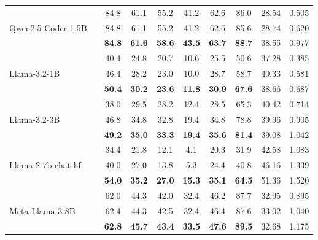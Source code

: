 \begin{table}[t]
\begin{tabular}{llcccccccc}
            \midrule
             & \standard{} & 84.8 & 61.1 & 55.2 & 41.2 & 62.6 & 86.0 & 28.54 & 0.505 \\
Qwen2.5-Coder-1.5B & \syncode{} & 84.8 & 61.1 & 55.2 & 41.2 & 62.6 & 85.6 & 28.74 & 0.620 \\
\textbf{} & \Tool{} & \textbf{84.8} & \textbf{61.6} & \textbf{58.6} & \textbf{43.5} & \textbf{63.7} & \textbf{88.7} & 38.55 & 0.977 \\

            \midrule
             & \standard{} & 40.4 & 24.8 & 20.7 & 10.6 & 25.5 & 50.6 & 37.28 & 0.385 \\
Llama-3.2-1B & \syncode{} & 46.4 & 28.2 & 23.0 & 10.0 & 28.7 & 58.7 & 40.33 & 0.581 \\
\textbf{} & \Tool{} & \textbf{50.4} & \textbf{30.2} & \textbf{23.6} & \textbf{11.8} & \textbf{30.9} & \textbf{67.6} & 38.66 & 0.687 \\

            \midrule
             & \standard{} & 38.0 & 29.5 & 28.2 & 12.4 & 28.5 & 65.3 & 40.42 & 0.714 \\
Llama-3.2-3B & \syncode{} & 46.8 & 34.8 & 32.8 & 19.4 & 34.8 & 78.8 & 39.96 & 0.905 \\
\textbf{} & \Tool{} & \textbf{49.2} & \textbf{35.0} & \textbf{33.3} & \textbf{19.4} & \textbf{35.6} & \textbf{81.4} & 39.08 & 1.042 \\

            \midrule
             & \standard{} & 34.4 & 21.8 & 12.1 & 4.1 & 20.3 & 31.9 & 42.58 & 1.083 \\
Llama-2-7b-chat-hf & \syncode{} & 40.0 & 27.0 & 13.8 & 5.3 & 24.4 & 40.8 & 46.16 & 1.339 \\
\textbf{} & \Tool{} & \textbf{54.0} & \textbf{35.2} & \textbf{27.0} & \textbf{15.3} & \textbf{35.1} & \textbf{64.5} & 51.36 & 1.520 \\

            \midrule
             & \standard{} & 62.0 & 44.3 & 42.0 & 32.4 & 46.2 & 87.7 & 32.95 & 0.895 \\
Meta-Llama-3-8B & \syncode{} & 62.4 & 44.3 & 42.5 & 32.4 & 46.4 & 87.6 & 33.02 & 1.040 \\
\textbf{} & \Tool{} & \textbf{62.8} & \textbf{45.7} & \textbf{43.4} & \textbf{33.5} & \textbf{47.6} & \textbf{89.5} & 32.68 & 1.175 \\

\bottomrule
    \end{tabular}
    \label{tab:sql_comparison}
    \vspace{-.2in}
\end{table}

